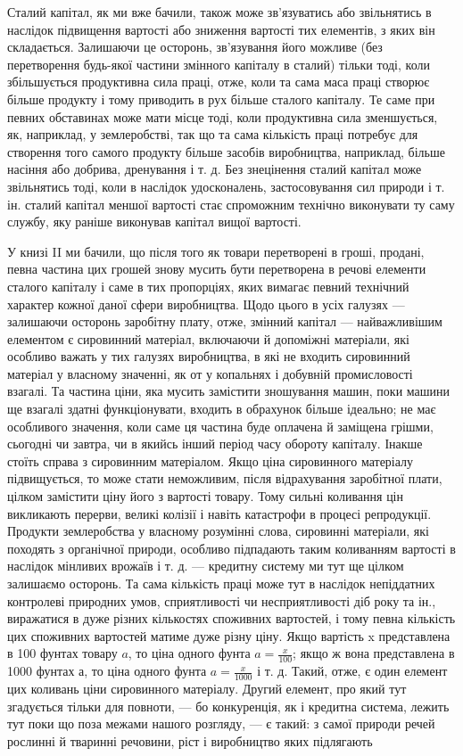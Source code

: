 Сталий капітал, як ми вже бачили, також може зв’язуватись
або звільнятись в наслідок підвищення вартості або зниження
вартості тих елементів, з яких він складається. Залишаючи це
осторонь, зв’язування його можливе (без перетворення будь-якої
частини змінного капіталу в сталий) тільки тоді, коли збільшується
продуктивна сила праці, отже, коли та сама маса праці
створює більше продукту і тому приводить в рух більше сталого капіталу. Те саме при певних
обставинах може мати місце
тоді, коли продуктивна сила зменшується, як, наприклад, у землеробстві, так що та сама кількість
праці потребує для створення
того самого продукту більше засобів виробництва, наприклад,
більше насіння або добрива, дренування і т. д. Без знецінення
сталий капітал може звільнятись тоді, коли в наслідок удосконалень, застосовування сил природи і т.
ін. сталий капітал меншої вартості стає спроможним технічно виконувати ту саму службу, яку раніше
виконував капітал вищої вартості.

У книзі II ми бачили, що після того як товари перетворені
в гроші, продані, певна частина цих грошей знову мусить бути
перетворена в речові елементи сталого капіталу і саме в тих
пропорціях, яких вимагає певний технічний характер кожної
даної сфери виробництва. Щодо цього в усіх галузях — залишаючи осторонь заробітну плату, отже,
змінний капітал — найважливішим елементом є сировинний матеріал, включаючи й допоміжні матеріали,
які особливо важать у тих галузях виробництва, в які не входить сировинний матеріал у власному
значенні, як от у копальнях і добувній промисловості взагалі. Та частина ціни, яка мусить замістити
зношування машин, поки
машини ще взагалі здатні функціонувати, входить в обрахунок
більше ідеально; не має особливого значення, коли саме ця
частина буде оплачена й заміщена грішми, сьогодні чи завтра,
чи в якийсь інший період часу обороту капіталу. Інакше стоїть
справа з сировинним матеріалом. Якщо ціна сировинного матеріалу підвищується, то може стати
неможливим, після відрахування заробітної плати, цілком замістити ціну його з вартості товару. Тому
сильні коливання цін викликають перерви, великі
колізії і навіть катастрофи в процесі репродукції. Продукти
землеробства у власному розумінні слова, сировинні матеріали,
які походять з органічної природи, особливо підпадають таким
коливанням вартості в наслідок мінливих врожаїв і т. д. — кредитну систему ми тут ще цілком
залишаємо осторонь. Та сама
кількість праці може тут в наслідок непіддатних контролеві природних умов, сприятливості чи
несприятливості діб року та ін.,
виражатися в дуже різних кількостях споживних вартостей,
і тому певна кількість цих споживних вартостей матиме дуже
різну ціну. Якщо вартість x представлена в 100 фунтах товару $a$, то ціна одного фунта $a = \frac{x}{100}$; якщо
ж вона представлена в 1000 фунтах $а$, то ціна одного фунта $a = \frac{x}{1000}$ і т. д. Такий, отже, є один
елемент цих коливань ціни сировинного матеріалу.
Другий елемент, про який тут згадується тільки для повноти, — бо конкуренція, як і кредитна система,
лежить тут поки що поза
межами нашого розгляду, — є такий: з самої природи речей
рослинні й тваринні речовини, ріст і виробництво яких підлягають
\parbreak{}  %
